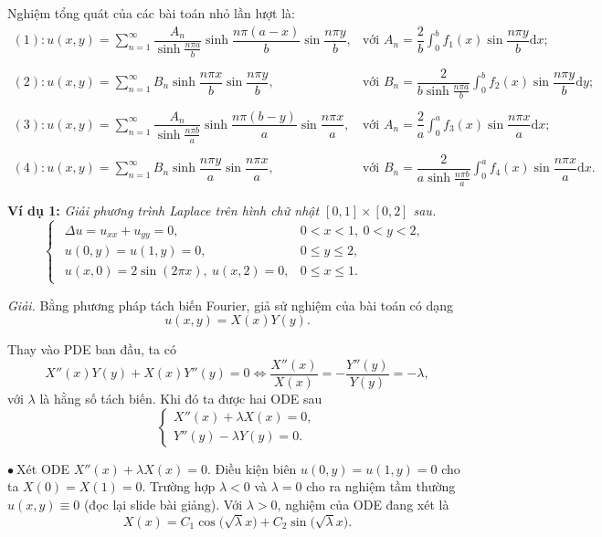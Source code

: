\documentclass[10pt, a4paper]{article}
\begin{document}
	Nghiệm tổng quát của các bài toán nhỏ lần lượt là: $$\begin{array}{ll}
		(1)\colon u(x,y)=\displaystyle\sum_{n=1}^\infty\dfrac{A_n}{\sinh\frac{n\pi a}{b}}\sinh\dfrac{n\pi(a-x)}{b}\sin\dfrac{n\pi y}{b}, & \text{với }A_n=\dfrac2b\displaystyle\int_0^bf_1(x)\sin\dfrac{n\pi y}{b}\text{d}x;\\\\
		(2)\colon u(x,y)=\displaystyle\sum_{n=1}^\infty B_n\sinh\dfrac{n\pi x}{b}\sin\dfrac{n\pi y}{b}, & \text{với }B_n=\dfrac2{b\sinh\frac{n\pi a}{b}}\displaystyle\int_0^bf_2(x)\sin\dfrac{n\pi y}{b}\text{d}y;\\\\
		(3)\colon u(x,y)=\displaystyle\sum_{n=1}^\infty\dfrac{A_n}{\sinh\frac{n\pi b}{a}}\sinh\dfrac{n\pi(b-y)}{a}\sin\dfrac{n\pi x}{a}, & \text{với }A_n=\dfrac2a\displaystyle\int_0^af_3(x)\sin\dfrac{n\pi x}{a}\text{d}x;\\\\
		(4)\colon u(x,y)=\displaystyle\sum_{n=1}^\infty B_n\sinh\dfrac{n\pi y}{a}\sin\dfrac{n\pi x}{a}, & \text{với }B_n=\dfrac2{a\sinh\frac{n\pi b}{a}}\displaystyle\int_0^af_4(x)\sin\dfrac{n\pi x}{a}\text{d}x.
	\end{array}$$
	
	\textbf{Ví dụ 1:} \textit{Giải phương trình Laplace trên hình chữ nhật $[0,1]\times[0,2]$ sau.} $$\begin{cases}
		\begin{array}{ll}
			\Delta u=u_{xx}+u_{yy}=0, & 0<x<1,~0<y<2,\\
			u(0,y)=u(1,y)=0, & 0\le y\le 2,\\
			u(x,0)=2\sin(2\pi x),~u(x,2)=0, & 0\le x\le 1.
		\end{array}
	\end{cases}$$
	
	\textit{Giải.} Bằng phương pháp tách biến Fourier, giả sử nghiệm của bài toán có dạng $$u(x,y)=X(x)Y(y).$$
	
	Thay vào PDE ban đầu, ta có $$X''(x)Y(y)+X(x)Y''(y)=0\iff\frac{X''(x)}{X(x)}=-\frac{Y''(y)}{Y(y)}=-\lambda,$$
	với $\lambda$ là hằng số tách biến. Khi đó ta được hai ODE sau $$\begin{cases}
		X''(x)+\lambda X(x)=0,\\
		Y''(y)-\lambda Y(y)=0.
	\end{cases}$$
	
	$\bullet~$Xét ODE $X''(x)+\lambda X(x)=0$. Điều kiện biên $u(0,y)=u(1,y)=0$ cho ta $X(0)=X(1)=0$. Trường hợp $\lambda<0$ và $\lambda=0$ cho ra nghiệm tầm thường $u(x,y)\equiv0$ (đọc lại slide bài giảng). Với $\lambda>0$, nghiệm của ODE đang xét là $$X(x)=C_1\cos\big(\sqrt\lambda x\big)+C_2\sin\big(\sqrt\lambda x\big).$$
	
\end{document}
